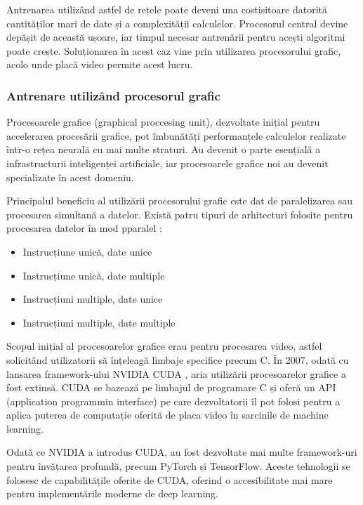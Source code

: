 \documentclass[a4paper, 12pt]{report}
\begin{document}
	Antrenarea utilizând astfel de rețele poate deveni una costisitoare datorită cantităților mari de date și a complexității calculelor. Procesorul central devine depășit de această ușoare, iar timpul necesar antrenării pentru acești algoritmi poate crește. Soluționarea în acest caz vine prin utilizarea procesorului grafic, acolo unde placă video permite acest lucru.
	
	\clearpage
	\subsubsection{Antrenare utilizând procesorul grafic}
	Procesoarele grafice (graphical proccesing unit), dezvoltate inițial pentru accelerarea procesării grafice, pot îmbunătăți performanțele calculelor realizate într-o rețea neurală cu mai multe straturi. Au devenit o parte esențială a  infrastructurii inteligenței artificiale, iar procesoarele grafice noi au devenit specializate în acest domeniu.
	
	Principalul beneficiu al utilizării procesorului grafic este dat de paralelizarea sau procesarea simultană a datelor. Există patru tipuri de arhitecturi folosite pentru procesarea datelor în mod pparalel :
	
	\begin{itemize}
		\item Instrucțiune unică, date unice
		\item Instrucțiune unică, date multiple
		\item Instrucțiuni multiple, date unice
		\item Instrucțiuni multiple, date multiple
	\end{itemize}
	
	Scopul inițial al procesoarelor grafice erau pentru procesarea video, astfel solicitând utilizatorii să înțeleagă limbaje specifice precum C. În 2007, odată cu lansarea framework-ului NVIDIA CUDA \cite{cuda}, aria utilizării procesoarelor grafice a fost extinsă. CUDA se bazează pe limbajul de programare C și oferă un API (application programmin interface) pe care dezvoltatorii îl pot folosi pentru a aplica puterea de computație oferită de placa video în sarcinile de machine learning.
	
	Odată ce NVIDIA a introdus CUDA, au fost dezvoltate mai multe framework-uri pentru învățarea profundă, precum PyTorch și TensorFlow. Aceste tehnologii se folosesc de capabilitățile oferite de CUDA, oferind o accesibilitate mai mare pentru implementările moderne de deep learning.
	
\end{document}
